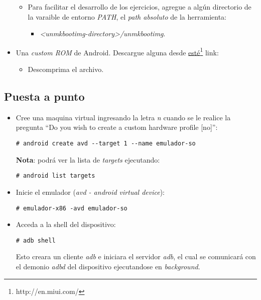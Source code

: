 \begin{itemize}
\begin{itemize}
      \item Para facilitar el desarrollo de los ejercicios, agregue a algún directorio de la varaible de entorno \textit{PATH}, el \textit{path absoluto} de la herramienta:
      \begin{itemize}
  \item \textit{<unmkbootimg-directory>/unmkbootimg}.
      \end{itemize}
 \end{itemize}
 
 \item Una \textit{custom ROM} de Android. Descargue alguna desde \href{http://en.miui.com/}{esté}\footnote{http://en.miui.com/} link:
 \begin{itemize}
      \item Descomprima el archivo.
 \end{itemize} 
\end{itemize}


\subsection{Puesta a punto}
\begin{itemize}
    \item Cree una maquina virtual ingresando la letra \textit{n} cuando se le realice la pregunta ``Do you wish to create a custom hardware profile [no]'':
    \begin{lstlisting}
# android create avd --target 1 --name emulador-so
    \end{lstlisting}
    \textbf{Nota}: podrá ver la lista de \textit{targets} ejecutando:
    \begin{lstlisting}
# android list targets
    \end{lstlisting}
    
    \item Inicie el emulador (\textit{avd - android virtual device}):
    \begin{lstlisting}
# emulador-x86 -avd emulador-so
    \end{lstlisting}

    \item Acceda a la shell del dispositivo:
    \begin{lstlisting}
# adb shell
    \end{lstlisting}
    Esto creara un cliente \textit{adb} e iniciara el servidor \textit{adb}, el cual se comunicará con el demonio \textit{adbd} del dispositivo ejecutandose en \textit{background}.
\end{itemize}

